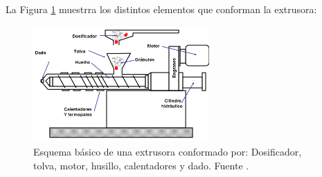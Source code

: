 La Figura \ref{fig:estado_extrusora} muestrra los distintos elementos que conforman la extrusora:

\begin{figure}[!ht]
    \centering
    \includegraphics[width=0.6\textwidth]{images/extrusor.png}
    \caption[Esquema básico de una extrusora.]{Esquema básico de una extrusora conformado por: Dosificador, tolva, motor, husillo, calentadores y dado. Fuente \cite{disenoextrusor}.}
    \label{fig:estado_extrusora}
\end{figure}

